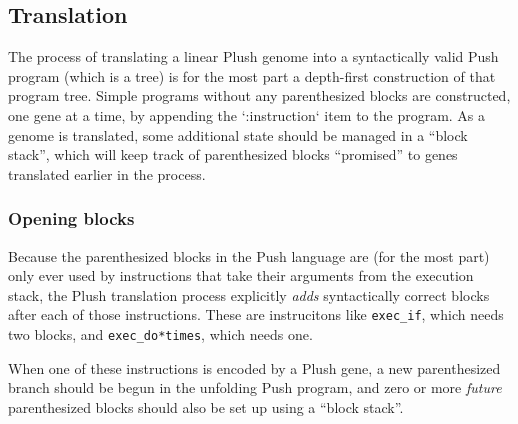 \subsection{Translation}

The process of translating a linear Plush genome into a syntactically valid Push program (which is a tree) is for the most part a depth-first construction of that program tree. Simple programs without any parenthesized blocks are constructed, one gene at a time, by appending the `:instruction` item to the program. As a genome is translated, some additional state should be managed in a ``block stack'', which will keep track of parenthesized blocks ``promised'' to genes translated earlier in the process.

\subsubsection{Opening blocks}

Because the parenthesized blocks in the Push language are (for the most part)
only ever used by instructions that take their arguments from the execution stack,
the Plush translation process explicitly \textit{adds} syntactically correct
blocks after each of those instructions. These are instrucitons like
\texttt{exec\_if}, which needs two blocks, and \texttt{exec\_do*times}, which needs
one.


When one of these instructions is encoded by a Plush gene, a new
parenthesized branch should be begun in the unfolding Push program, and zero or
more \textit{future} parenthesized blocks should also be set up using a
``block stack''.

